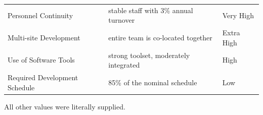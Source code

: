 \documentclass[letterpaper,10pt]{article}
\begin{document}
\begin{enumerate}
\begin{table}[htdp]
\begin{center}
\begin{tabular}{lll}
Personnel Continuity & stable staff with 3\% annual turnover & Very High \\
Multi-site Development & entire team is co-located together & Extra High \\
Use of Software Tools & strong toolset, moderately integrated & High \\
Required Development Schedule & 85\% of the nominal schedule & Low \\
\hline
\end{tabular}
\end{center}
\end{table}%
\par
All other values were literally supplied.
\end {enumerate}
\end{document}
